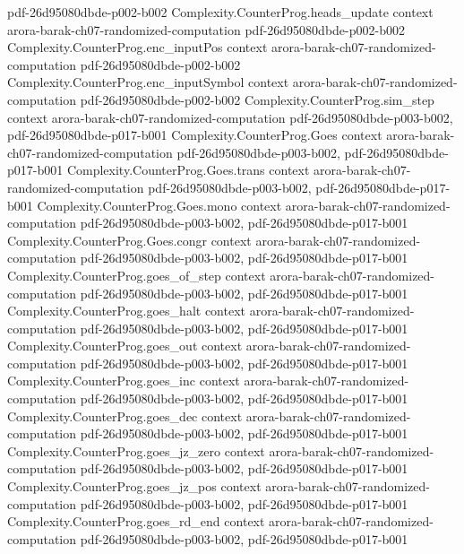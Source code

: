 \begin{theorem}
  {pdf-26d95080dbde-p002-b002}
\proofstep
  {Complexity.CounterProg.heads_update}
  {context}
  {arora-barak-ch07-randomized-computation}
  {pdf-26d95080dbde-p002-b002}
\proofstep
  {Complexity.CounterProg.enc_inputPos}
  {context}
  {arora-barak-ch07-randomized-computation}
  {pdf-26d95080dbde-p002-b002}
\proofstep
  {Complexity.CounterProg.enc_inputSymbol}
  {context}
  {arora-barak-ch07-randomized-computation}
  {pdf-26d95080dbde-p002-b002}
\proofstep
  {Complexity.CounterProg.sim_step}
  {context}
  {arora-barak-ch07-randomized-computation}
  {pdf-26d95080dbde-p003-b002,
    pdf-26d95080dbde-p017-b001}
\proofstep
  {Complexity.CounterProg.Goes}
  {context}
  {arora-barak-ch07-randomized-computation}
  {pdf-26d95080dbde-p003-b002,
    pdf-26d95080dbde-p017-b001}
\proofstep
  {Complexity.CounterProg.Goes.trans}
  {context}
  {arora-barak-ch07-randomized-computation}
  {pdf-26d95080dbde-p003-b002,
    pdf-26d95080dbde-p017-b001}
\proofstep
  {Complexity.CounterProg.Goes.mono}
  {context}
  {arora-barak-ch07-randomized-computation}
  {pdf-26d95080dbde-p003-b002,
    pdf-26d95080dbde-p017-b001}
\proofstep
  {Complexity.CounterProg.Goes.congr}
  {context}
  {arora-barak-ch07-randomized-computation}
  {pdf-26d95080dbde-p003-b002,
    pdf-26d95080dbde-p017-b001}
\proofstep
  {Complexity.CounterProg.goes_of_step}
  {context}
  {arora-barak-ch07-randomized-computation}
  {pdf-26d95080dbde-p003-b002,
    pdf-26d95080dbde-p017-b001}
\proofstep
  {Complexity.CounterProg.goes_halt}
  {context}
  {arora-barak-ch07-randomized-computation}
  {pdf-26d95080dbde-p003-b002,
    pdf-26d95080dbde-p017-b001}
\proofstep
  {Complexity.CounterProg.goes_out}
  {context}
  {arora-barak-ch07-randomized-computation}
  {pdf-26d95080dbde-p003-b002,
    pdf-26d95080dbde-p017-b001}
\proofstep
  {Complexity.CounterProg.goes_inc}
  {context}
  {arora-barak-ch07-randomized-computation}
  {pdf-26d95080dbde-p003-b002,
    pdf-26d95080dbde-p017-b001}
\proofstep
  {Complexity.CounterProg.goes_dec}
  {context}
  {arora-barak-ch07-randomized-computation}
  {pdf-26d95080dbde-p003-b002,
    pdf-26d95080dbde-p017-b001}
\proofstep
  {Complexity.CounterProg.goes_jz_zero}
  {context}
  {arora-barak-ch07-randomized-computation}
  {pdf-26d95080dbde-p003-b002,
    pdf-26d95080dbde-p017-b001}
\proofstep
  {Complexity.CounterProg.goes_jz_pos}
  {context}
  {arora-barak-ch07-randomized-computation}
  {pdf-26d95080dbde-p003-b002,
    pdf-26d95080dbde-p017-b001}
\proofstep
  {Complexity.CounterProg.goes_rd_end}
  {context}
  {arora-barak-ch07-randomized-computation}
  {pdf-26d95080dbde-p003-b002,
    pdf-26d95080dbde-p017-b001}

\end{theorem}

